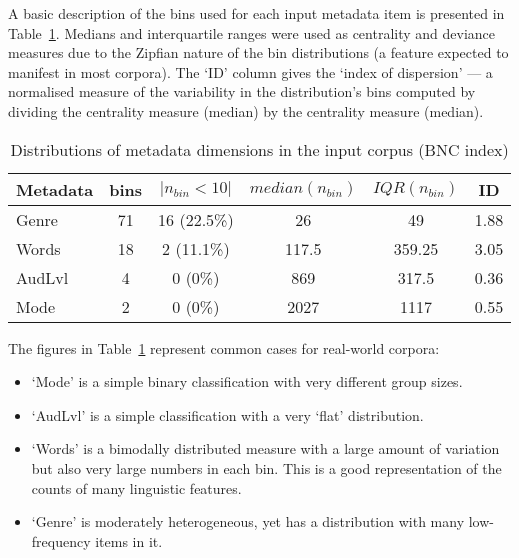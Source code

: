 A basic description of the bins used for each input metadata item is presented in Table~\ref{table:evaluation:resampling:inputdist}.  Medians and interquartile ranges were used as centrality and deviance measures due to the Zipfian nature of the bin distributions (a feature expected to manifest in most corpora).  The `ID' column gives the `index of dispersion' --- a normalised measure of the variability in the distribution's bins computed by dividing the centrality measure (median) by the centrality measure (median).

\begin{table}[Ht]
    \centering

    \begin{tabular}{|l|c|c|c|c|c|}
        \hline
        Metadata & bins & $|n_{bin} < 10|$ & $median(n_{bin})$ & $IQR(n_{bin})$ & ID  \\
        \hline
        Genre & 71  & 16 (22.5\%)   & 26    & 49        & 1.88    \\
        Words & 18  & 2 (11.1\%)    & 117.5 & 359.25    & 3.05    \\
        AudLvl& 4   & 0 (0\%)       & 869   & 317.5     & 0.36    \\
        Mode  & 2   & 0 (0\%)       & 2027  & 1117      & 0.55    \\
        \hline
    \end{tabular}
    \caption{Distributions of metadata dimensions in the input corpus (BNC index)}
    \label{table:evaluation:resampling:inputdist}
\end{table}

The figures in Table~\ref{table:evaluation:resampling:inputdist} represent common cases for real-world corpora:

\begin{itemize}
    \item `Mode' is a simple binary classification with very different group sizes.
    \item `AudLvl' is a simple classification with a very `flat' distribution.
    \item `Words' is a bimodally distributed measure with a large amount of variation but also very large numbers in each bin.  This is a good representation of the counts of many linguistic features.
    \item `Genre' is moderately heterogeneous, yet has a distribution with many low-frequency items in it.
\end{itemize}

